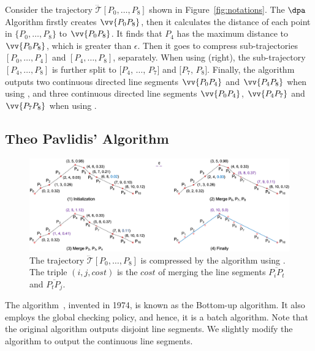 \begin{example}
\label{exm-alg-lsa}
Consider the trajectory $\dddot{\mathcal{T}}[P_0,\ldots,P_{8}]$ shown in Figure~\ref{fig:notations}.
The $\dpa$ Algorithm firstly creates $\vv{P_0P_{8}}$, then it calculates the distance of each point in $\{P_0,\ldots,P_{8}\}$ to $\vv{P_0P_{8}}$.
It finds that $P_{4}$ has the maximum distance to $\vv{P_0P_{8}}$, which is greater than $\epsilon$. Then it goes to compress sub-trajectories $[P_0, \ldots, P_{4}]$ and $[P_{4}, \ldots, P_{8}]$, separately.
When using \sed (right), the sub-trajectory $[P_4,\ldots, P_{8}]$ is further split to $[P_4$, $\ldots$, $P_7]$ and $[P_7$, $P_{8}]$.
Finally, the algorithm outputs two continuous directed line segments $\vv{P_0P_4}$ and $\vv{P_4P_8}$ when using \ped, and three continuous directed line segments $\vv{P_0P_4}$, $\vv{P_4P_7}$ and $\vv{P_7P_8}$ when using \sed.
\end{example}




\subsection{Theo Pavlidis' Algorithm}

\begin{figure}[tb!]
\centering
\includegraphics[scale=0.66]{figures/Fig-Pavlidis.png}
\vspace{-1ex}
\caption{\small The trajectory $\dddot{\mathcal{T}}[P_0, \ldots, P_{8}]$ is compressed by the \pavlidis algorithm using \ped. The triple $(i, j, cost)$ is the $cost$ of merging the line segments $\overline{P_iP_t}$ and $\overline{P_tP_j}$. }
\vspace{-2ex}
\label{fig:pavlidis}
\end{figure}

The {\pavlidis algorithm}~\cite{Pavlidis:Segment}, invented in 1974, is known as the Bottom-up algorithm. It also employs the global checking policy, and hence, it is a batch algorithm. Note that the original \pavlidis algorithm outputs disjoint line segments. We slightly modify the algorithm to output the continuous line segments.

